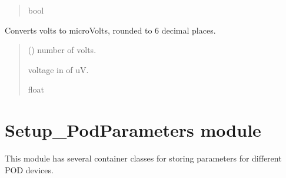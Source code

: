 \documentclass[letterpaper,10pt,english]{sphinxmanual}
\begin{document}
\begin{fulllineitems}
\begin{fulllineitems}
\begin{quote}
\begin{description}
\sphinxAtStartPar
bool

\end{description}\end{quote}

\end{fulllineitems}


\begin{fulllineitems}
\label{\detokenize{Setup_PodInterface:Setup_PodInterface.Setup_Interface._uV}}
\pysigstartsignatures
{}
\pysigstopsignatures
\sphinxAtStartPar
Converts volts to microVolts, rounded to 6 decimal places.
\begin{quote}\begin{description}
\sphinxAtStartPar
{} (\sphinxstyleliteralemphasis{\sphinxupquote{ | }}) \textendash{} number of volts.

\sphinxAtStartPar
voltage in of uV.

\sphinxAtStartPar
float

\end{description}\end{quote}

\end{fulllineitems}


\end{fulllineitems}


\sphinxstepscope


\section{Setup\_PodParameters module}
\label{\detokenize{Setup_PodParameters:module-Setup_PodParameters}}\label{\detokenize{Setup_PodParameters:setup-podparameters-module}}\label{\detokenize{Setup_PodParameters::doc}}
\sphinxAtStartPar
This module has several container classes for storing parameters for different POD devices.
\end{document}
